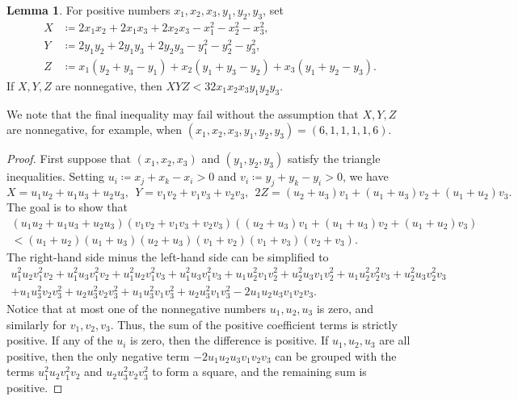 \documentclass{amsart}
\theoremstyle{definition}
\newtheorem{lemma}[theorem]{Lemma}
\theoremstyle{remark}
\begin{document}
\begin{lemma}\label{lem:hard_lemma}
For positive numbers $x_1,x_2,x_3,y_1,y_2,y_3$, set
\begin{align*}
X&\coloneq 2x_1x_2+2x_1x_3+2x_2x_3-x_1^2-x_2^2-x_3^2,\\
Y&\coloneq 2y_1y_2+2y_1y_3+2y_2y_3-y_1^2-y_2^2-y_3^2,\\
Z&\coloneq x_1(y_2+y_3-y_1)+x_2(y_1+y_3-y_2)+x_3(y_1+y_2-y_3).
\end{align*}
If $X,Y,Z$ are nonnegative, then $XYZ < 32x_1x_2x_3y_1y_2y_3$.
\end{lemma}

We note that the final inequality may fail without the assumption that $X,Y,Z$ are nonnegative, for example, when $(x_1,x_2,x_3,y_1,y_2,y_3)=(6,1,1,1,1,6)$.

\begin{proof}
First suppose that $(x_1,x_2,x_3)$ and $(y_1,y_2,y_3)$ satisfy the triangle inequalities.
Setting $u_i\coloneq x_j+x_k-x_i>0$ and $v_i\coloneq y_j+y_k-y_i>0$, we have
\[
X=u_1u_2+u_1u_3+u_2u_3, \ \ Y=v_1v_2+v_1v_3+v_2v_3, \ \ 2Z=(u_2+u_3)v_1+(u_1+u_3)v_2+(u_1+u_2)v_3.
\]
The goal is to show that
\begin{multline*}
(u_1u_2+u_1u_3+u_2u_3)(v_1v_2+v_1v_3+v_2v_3)((u_2+u_3)v_1+(u_1+u_3)v_2+(u_1+u_2)v_3) \\
< (u_1+u_2)(u_1+u_3)(u_2+u_3)(v_1+v_2)(v_1+v_3)(v_2+v_3).
\end{multline*}
The right-hand side minus the left-hand side can be simplified to
\begin{multline*}
u_1^2 u_2 v_1^2 v_2+ u_1^2 u_3 v_1^2 v_2+ u_1^2 u_2 v_1^2 v_3+ u_1^2 u_3 v_1^2 v_3+ u_1 u_2^2 v_1 v_2^2  + u_2^2 u_3 v_1 v_2^2  + u_1 u_2^2 v_2^2 v_3 + u_2^2 u_3 v_2^2 v_3\\
 + u_1 u_3^2 v_2 v_3^2 + u_2 u_3^2 v_2 v_3^2  + u_1 u_3^2 v_1 v_3^2  + u_2 u_3^2 v_1 v_3^2 - 2 u_1 u_2 u_3 v_1 v_2 v_3.
\end{multline*}
Notice that at most one of the nonnegative numbers $u_1,u_2,u_3$ is zero, and similarly for $v_1,v_2,v_3$. Thus, the sum of the positive coefficient terms is strictly positive. If any of the $u_i$ is zero, then the difference is positive. If $u_1,u_2,u_3$ are all positive, then
the only negative term $- 2 u_1 u_2 u_3 v_1 v_2 v_3 $ can be grouped with the terms $u_1^2 u_2 v_1^2 v_2$ and $u_2 u_3^2 v_2 v_3^2$ to form a square, and the remaining sum is positive.


\end{proof}
\end{document}
